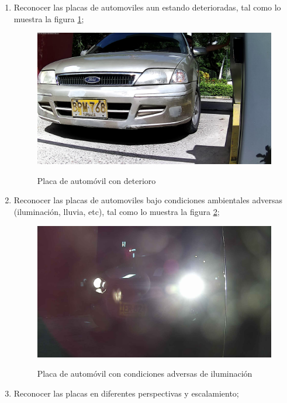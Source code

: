 \begin{enumerate}
    \item Reconocer las placas de automoviles aun estando deterioradas, tal como lo muestra la figura \ref{fig:deteriorada}; 
  \begin{figure}[H]
\begin{center}
   {\includegraphics[width=0.8 \linewidth]{imagenes/Deterioradas/deteri.jpg}}
    \caption{Placa de automóvil con deterioro}
    \label{fig:deteriorada} 
\end{center}
\end{figure}
\item Reconocer las placas de automoviles bajo condiciones ambientales adversas (iluminación, lluvia, etc), tal como lo muestra la figura \ref{fig:adversas}; 
    \begin{figure}[H]
\begin{center}
   {\includegraphics[width=0.8 \linewidth]{imagenes/Deterioradas/2018-11-04_17-57-36.jpg}}
    \caption{Placa de automóvil con condiciones adversas de iluminación}
    \label{fig:adversas} 
\end{center}
\end{figure}  
\item Reconocer las placas en diferentes perspectivas y escalamiento; 

\end{enumerate}
